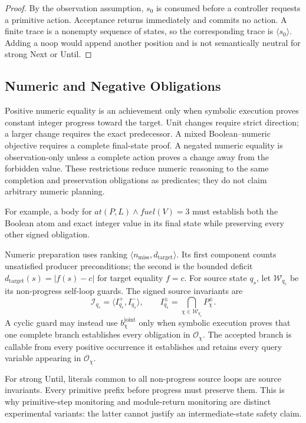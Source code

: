 \begin{proof}
By the observation assumption, $s_0$ is consumed before a controller requests a
primitive action. Acceptance returns immediately and commits no action. A finite
trace is a nonempty sequence of states, so the corresponding trace is
$\langle s_0\rangle$. Adding a noop would append another position and is not
semantically neutral for strong Next or Until.
\end{proof}

\subsection{Numeric and Negative Obligations}

Positive numeric equality is an achievement only when symbolic execution proves
constant integer progress toward the target. Unit changes require strict
direction; a larger change requires the exact predecessor. A mixed
Boolean--numeric objective requires a complete final-state proof. A negated
numeric equality is observation-only unless a complete action proves a change
away from the forbidden value. These restrictions reduce numeric reasoning to
the same completion and preservation obligations as predicates; they do not
claim arbitrary numeric planning.

For example, a body for
$\mathit{at}(P,L)\land\mathit{fuel}(V)=3$ must establish both the Boolean atom
and exact integer value in its final state while preserving every other signed
obligation.

Numeric preparation uses ranking
$\langle n_{\mathrm{miss}},d_{\mathrm{target}}\rangle$. Its first component
counts unsatisfied producer preconditions; the second is the bounded deficit
$d_{\mathrm{target}}(s)=|f(s)-c|$ for target equality $f=c$. For source state
$q_s$, let $\mathcal W_{q_s}$ be its non-progress self-loop guards. The signed
source invariants are
\[
\mathcal I_{q_s}=\langle I_{q_s}^+,I_{q_s}^-\rangle,
\qquad I_{q_s}^{\pm}=\bigcap_{\chi\in\mathcal W_{q_s}}P_\chi^{\pm}.
\]
A cyclic
guard may instead use $b_\chi^{\mathrm{joint}}$ only when symbolic execution
proves that one complete branch establishes every obligation in
$\mathcal O_\chi$. The accepted branch is callable from every positive
occurrence it establishes and retains every query variable appearing in
$\mathcal O_\chi$.

For strong Until, literals common to all non-progress source loops are source
invariants. Every primitive prefix before progress must preserve them. This is
why primitive-step monitoring and module-return monitoring are distinct
experimental variants: the latter cannot justify an intermediate-state safety
claim.

